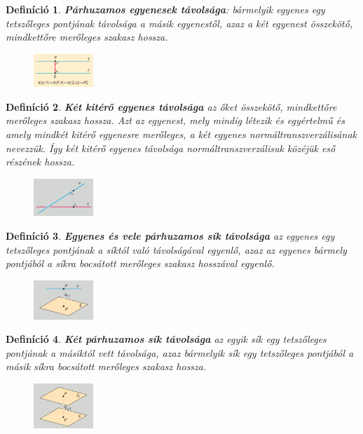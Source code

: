 \documentclass[12pt,a4paper]{article}
\newtheorem{definition}{Definíció} [section]
\begin{document}
\begin{definition}
\textbf{Párhuzamos egyenesek távolsága}: bármelyik egyenes egy tetszőleges pontjának távolsága a másik egyenestől, azaz a két egyenest összekötő, mindkettőre merőleges szakasz hossza.
\begin{figure}[h]
\centering
\includegraphics[width=0.2\textwidth]{parh_egyenesek_tavolsaga}
\end{figure}
\end{definition}
\begin{definition}
\textbf{Két kitérő egyenes távolsága} az őket összekötő, mindkettőre merőleges szakasz hossza. Azt az egyenest, mely mindig létezik és egyértelmű és amely mindkét kitérő egyenesre merőleges, a két egyenes normáltranszverzálisának nevezzük. Így két kitérő egyenes távolsága normáltranszverzálisuk közéjük eső részének hossza.
\begin{figure}[h!]
\centering
\includegraphics[width=0.2\textwidth]{kitero_egyenesek_tavolsaga}
\end{figure}
\end{definition}
\newpage
\begin{definition}
\textbf{Egyenes és vele párhuzamos sík távolsága} az egyenes egy tetszőleges pontjának a síktól való távolságával egyenlő, azaz az egyenes bármely pontjából a síkra bocsátott merőleges szakasz hosszával egyenlő.
\begin{figure}[h]
\centering
\includegraphics[width=0.2\textwidth]{egyenes_sik_tavolsag}
\end{figure}
\end{definition}
\begin{definition}
\textbf{Két párhuzamos sík távolsága} az egyik sík egy tetszőleges pontjának a másiktól vett távolsága, azaz bármelyik sík egy tetszőleges pontjából a másik síkra bocsátott merőleges szakasz hossza.
\begin{figure}[h]
\centering
\includegraphics[width=0.2\textwidth]{parh_sikok_tavolsaga}
\end{figure}
\end{definition}
\end{document}
